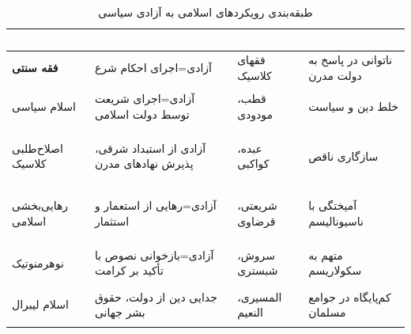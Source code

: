 \begin{table}[h!]
\centering
\caption{طبقه‌بندی رویکردهای اسلامی به آزادی سیاسی}
\label{tab:islamfreedom}
\renewcommand{\arraystretch}{1.5}

\begin{tabularx}{\textwidth}{|>{\bfseries}p{2.5cm}|>{\raggedright}X|>{\raggedright}X|>{\raggedright\arraybackslash}X|}
\hline
\rowcolor{PrimaryDeep}
\textcolor{white}{\textbf{رویکرد}} &
\textcolor{white}{\textbf{تعریف آزادی}} &
\textcolor{white}{\textbf{نمایندگان}} &
\textcolor{white}{\textbf{نقد اصلی}} \\
\hline

\rowcolor{EraAncient!15}
فقه سنتی & آزادی=اجرای احکام شرع & فقهای کلاسیک & ناتوانی در پاسخ به دولت مدرن \\
\hline

\rowcolor{EraMedieval!15}
اسلام سیاسی & آزادی=اجرای شریعت توسط دولت اسلامی & قطب، مودودی & خلط دین و سیاست \\
\hline

\rowcolor{EraEarlyMod!15}
اصلاح‌طلبی کلاسیک & آزادی از استبداد شرقی، پذیرش نهادهای مدرن & عبده، کواکبی & سازگاری ناقص \\
\hline

\rowcolor{EraModern!15}
رهایی‌بخشی اسلامی & آزادی=رهایی از استعمار و استثمار & شریعتی، قرضاوی & آمیختگی با ناسیونالیسم \\
\hline

\rowcolor{EraContemp!15}
نوهرمنوتیک & آزادی=بازخوانی نصوص با تأکید بر کرامت & سروش، شبستری & متهم به سکولاریسم \\
\hline

\rowcolor{EraPostmod!15}
اسلام لیبرال & جدایی دین از دولت، حقوق بشر جهانی & المسیری، النعیم & کم‌پایگاه در جوامع مسلمان \\
\hline

\end{tabularx}
\end{table}

\newpage
